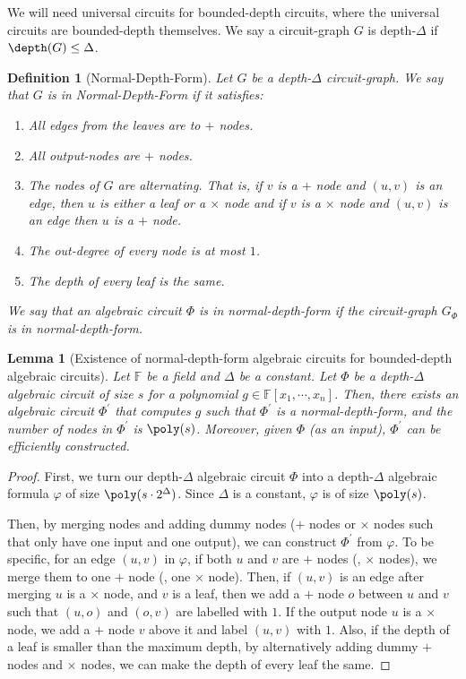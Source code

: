 \documentclass[11pt,letter]{article}
\newtheorem{lemma}[theorem]{Lemma}
\newtheorem{definition}[theorem]{Definition}
\theoremstyle{remark} %
\begin{document}
{    We will need universal circuits for bounded-depth circuits, where the universal circuits are bounded-depth themselves. We say a circuit-graph $G$ is depth-$\Delta$ if $\depth(G) \leq \Delta$.
    \begin{definition}[Normal-Depth-Form]
        Let $G$ be a depth-$\Delta$ circuit-graph. We say that $G$ is in Normal-Depth-Form if it satisfies:
        \begin{enumerate}
            \item All edges from the leaves are to $+$ nodes.
            \item All output-nodes are $+$ nodes.
            \item The nodes of $G$ are alternating. That is, if $v$ is a $+$ node and $(u,v)$ is an edge, then $u$ is either a leaf or a $\times$ node and if $v$ is a $\times$ node and $(u,v)$ is an edge then $u$ is a $+$ node.
            \item The out-degree of every node is at most $1$.
            \item The depth of every leaf is the same.
            
        \end{enumerate}
        We say that an algebraic circuit $\Phi$ is in \emph{normal-depth-form} if the circuit-graph $G_\Phi$ is in normal-depth-form.
    \end{definition}
    

    \begin{lemma}[Existence of normal-depth-form algebraic circuits for bounded-depth algebraic circuits]
        \label{lemma: existence of n-d-2d-f}
        Let $\mathbb{F}$ be a field and $\Delta$ be a constant. Let $\Phi$ be a depth-$\Delta$ algebraic circuit of size $s$ for a polynomial $g \in \mathbb{F}[x_1,\cdots,x_n]$. Then, there exists an algebraic circuit $\Phi^\prime$ that computes $g$ such that $\Phi^\prime$ is a normal-depth-form, and the number of nodes in $\Phi^\prime$ is $\poly(s)$. Moreover, given $\Phi$ (as an input), $\Phi^\prime$ can be efficiently constructed.
    \end{lemma}
     \begin{proof}
         First, we turn our depth-$\Delta$ algebraic circuit $\Phi$ into a depth-$\Delta$ algebraic formula $\varphi$ of size $\poly(s \cdot 2^\Delta)$. Since $\Delta$ is a constant, $\varphi$ is of size $\poly(s)$.
        
         Then, by merging nodes and adding dummy nodes ($+$ nodes or $\times$ nodes such that only have one input and one output), we can construct $\Phi^\prime$ from $\varphi$. To be specific, for an edge $(u,v)$ in $\varphi$, if both $u$ and $v$ are $+$ nodes (\resp, $\times$ nodes), we merge them to one $+$ node (\resp, one $\times$ node). Then, if $(u,v)$ is an edge after merging $u$ is a $\times$ node, and $v$ is a leaf, then we add a $+$ node $o$ between $u$ and $v$ such that $(u,o)$ and $(o,v)$ are labelled with $1$. If the output node $u$ is a $\times$ node, we add a $+$ node $v$ above it and label $(u,v)$ with $1$. Also, if the depth of a leaf is smaller than the maximum depth, by alternatively adding dummy $+$ nodes and $\times$ nodes, we can make the depth of every leaf the same.
         

\end{proof}}
\end{document}
